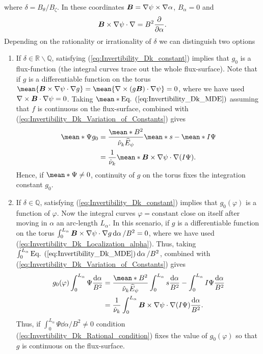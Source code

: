 \documentclass[10pt]{iopart}
\begin{document}
where $\delta = B_\theta/B_\zeta$. In these coordinates $\vb*{B} =\nabla \psi \times \nabla \alpha $, $B_\alpha = 0$ and
%
\begin{align}
	\vb*{B}\times\nabla \psi \cdot \nabla = 
	B^2 \pdv{}{\alpha}.
	\label{eq:Invertibility_Dk_Localization_alpha}
\end{align}
%
Depending on the rationality or irrationality of $\delta$ we can distinguish two options
%
\begin{enumerate}
	\item If $\delta \in \mathbb{R}\backslash\mathbb{Q}$, satisfying (\ref{eq:Invertibility_Dk_constant}) implies that $g_0$ is a flux-function (the integral curves trace out the whole flux-surface). Note that if $g$ is a differentiable function on the torus $\mean{ \vb*{B} \times \nabla \psi \cdot \nabla g } = \mean{ \nabla\times (g\vb*{B}) \cdot\nabla \psi }=0$, where we have used $\nabla\times\vb*{B}\cdot\nabla\psi = 0$. Taking $\mean*{\text{Eq. (\ref{eq:Invertibility_Dk_MDE})}}$ assuming that $f$ is continuous on the flux-surface, combined with (\ref{eq:Invertibility_Dk_Variation_of_Constants}) gives
	\begin{align} 
		\mean*{\Psi} g_0  
		& = 
		\frac{ \mean*{B^2} }{ \hat{\nu}_k \widehat{E}_\psi } 
		\mean*{s}
		- 
		\mean*{I \Psi}\nonumber
		\\
		& = 
		\frac{1}{\hat{\nu}_k}
		\mean*{\vb*{B}\times\nabla \psi \cdot \nabla(I \Psi)}. 
		\label{eq:Invertibility_Dk_Ergodic_condition}
	\end{align}
	Hence, if $\mean*{\Psi}\ne 0$, continuity of $g$ on the torus fixes the integration constant $g_0$. 
	
	\item If $\delta \in \mathbb{Q}$, satisfying (\ref{eq:Invertibility_Dk_constant}) implies that $g_0(\varphi)$ is a function of $\varphi$. Now the integral curves $\varphi=\text{constant}$ close on itself after moving in $\alpha$ an arc-length $L_\alpha$. In this scenario, if $g$ is a differentiable function on the torus $\int_{0}^{L_\alpha}\vb*{B}\times \nabla\psi \cdot \nabla g \dd{\alpha}/ B^2  = 0$, where we have used (\ref{eq:Invertibility_Dk_Localization_alpha}). Thus, taking $\int_{0}^{L_\alpha}\text{Eq. (\ref{eq:Invertibility_Dk_MDE})} \dd{\alpha}/ B^2 $, combined with (\ref{eq:Invertibility_Dk_Variation_of_Constants}) gives
	\begin{align}
		g_0(\varphi) \int_{0}^{L_\alpha} \Psi\frac{\dd{\alpha}}{ B^2 }
		& = 
		\frac{ \mean*{B^2} }{ \hat{\nu}_k \widehat{E}_\psi }
		\int_{0}^{L_\alpha} s    \frac{\dd{\alpha}}{ B^2 }
		\nonumber 
		-      
		\int_{0}^{L_\alpha}   I \Psi  \frac{\dd{\alpha}}{ B^2 }
		\\
		& =       
		\frac{1}{\hat{\nu}_k}
		\int_{0}^{L_\alpha}
		\vb*{B}\times\nabla \psi \cdot \nabla(I \Psi)
		\frac{\dd{\alpha}}{ B^2 }
		.
		\label{eq:Invertibility_Dk_Rational_condition}
	\end{align}
	Thus, if $\int_{0}^{L_\alpha} \Psi \dd{\alpha} / B^2 \ne 0 $ condition (\ref{eq:Invertibility_Dk_Rational_condition}) fixes the value of $g_0(\varphi)$ so that $g$ is continuous on the flux-surface. 
	
\end{enumerate}
\end{document}
